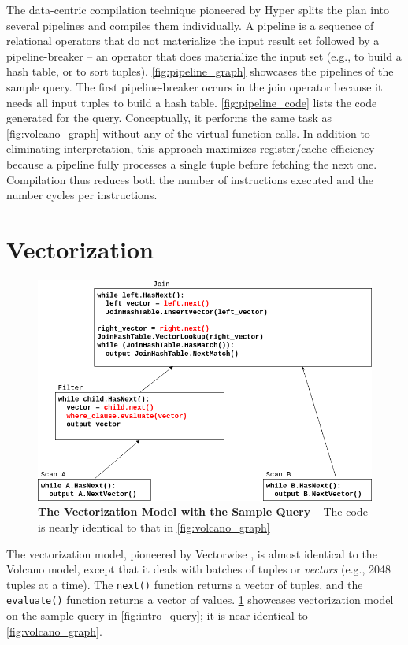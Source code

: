\documentclass[12pt]{cmuthesis}
\begin{document}
The data-centric compilation technique pioneered by Hyper \cite{hyper_llvm} splits the plan into several pipelines and compiles them individually. A pipeline is a sequence of relational operators that do not materialize the input result set followed by a pipeline-breaker -- an operator that does materialize the input set (e.g., to build a hash table, or to sort tuples). \cref{fig:pipeline_graph} showcases the pipelines of the sample query. The first pipeline-breaker occurs in the join operator because it needs all input tuples to build a hash table. \cref{fig:pipeline_code} lists the code generated for the query. Conceptually, it performs the same task as \cref{fig:volcano_graph} without any of the virtual function calls. In addition to eliminating interpretation, this approach maximizes register/cache efficiency because a pipeline fully processes a single tuple before fetching the next one. Compilation thus reduces both the number of instructions executed and the number cycles per instructions.
\fi

\section{Vectorization}
\begin{figure}[t!]
    \centering
    \includegraphics[scale=0.5]{images/Vectorization.png}
    \caption{\textbf{The Vectorization Model with the Sample Query} -- The code is nearly identical to that in \cref{fig:volcano_graph}}
    \label{fig:vectorization_graph}
\end{figure}

The vectorization model, pioneered by Vectorwise \cite{vectorwise}, is almost identical to the Volcano model, except that it deals with batches of tuples or \textit{vectors} (e.g., 2048 tuples at a time). The \texttt{next()} function returns a vector of tuples, and the \texttt{evaluate()} function returns a vector of values. \cref{fig:vectorization_graph} showcases vectorization model on the sample query in \cref{fig:intro_query}; it is near identical to \cref{fig:volcano_graph}.
\end{document}
